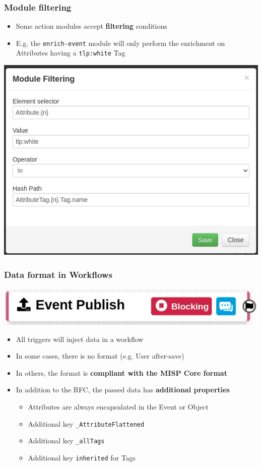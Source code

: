 \begin{frame}
    \frametitle{Module filtering}
    \begin{itemize}
        \item Some action modules accept \textbf{filtering} conditions
        \item E.g. the \texttt{enrich-event} module will only perform the enrichment on Attributes having a \texttt{tlp:white} Tag
    \end{itemize}
    \begin{center}
        \includegraphics[width=0.7\linewidth]{pictures/module-filtering.png}
    \end{center}
\end{frame}

\begin{frame}
    \frametitle{Data format in Workflows}
    \begin{center}
        \includegraphics[width=0.7\linewidth]{pictures/workflow-trigger.png}
    \end{center}
    \begin{itemize}
        \item All triggers will inject data in a workflow
        \item In some cases, there is no format (e.g. User after-save)
        \item In others, the format is \textbf{compliant with the MISP Core format}
        \item In addition to the RFC, the passed data has \textbf{additional properties}
        \begin{itemize}
            \item Attributes are always encapsulated in the Event or Object
            \item Additional key \texttt{\_AttributeFlattened}
            \item Additional key \texttt{\_allTags}
            \item Additional key \texttt{inherited} for Tags
        \end{itemize}
    \end{itemize}
\end{frame}


